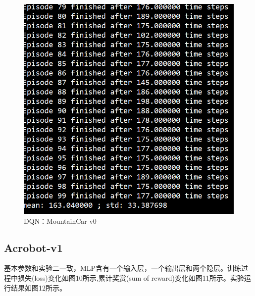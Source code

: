 \documentclass[a4paper,UTF8]{article}
\theoremstyle{definition}
\begin{document}
    \begin{center}
    \begin{figure}[H]
          \centering
          \includegraphics[width=12cm]{9.png}
          \caption{DQN：MountainCar-v0}
          \label{fig:2.3}
    \end{figure}
    \end{center}
    
    \subsection{Acrobot-v1}
    基本参数和实验二一致，MLP含有一个输入层，一个输出层和两个隐层。训练过程中损失(loss)变化如图10所示,累计奖赏(sum of reward)变化如图11所示。实验运行结果如图12所示。
\end{document}

